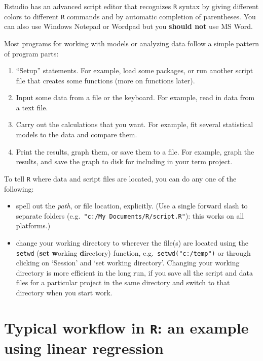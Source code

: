 \documentclass[11pt,]{article}
\begin{document}
Rstudio has an advanced script editor that recognizes \texttt{R} syntax by giving different colors to different \texttt{R} commands and by automatic completion of parentheses. You can also use Windows Notepad or Wordpad but you \textbf{should not} use MS Word.

Most programs for working with models or analyzing data follow a simple pattern of program parts:

\begin{enumerate}
\def\labelenumi{\arabic{enumi}.}
\item
  ``Setup'' statements. For example, load some packages, or run another script file that
  creates some functions (more on functions later).
\item
  Input some data from a file or the keyboard. For example, read in data from a text file.
\item
  Carry out the calculations that you want. For example, fit several statistical models to the data and compare them.
\item
  Print the results, graph them, or save them to a file. For example, graph the results, and save the graph to disk for including in your term project.
\end{enumerate}

To tell \texttt{R} where data and script files are located, you can do any one of the following:

\begin{itemize}
\item
  spell out the \emph{path}, or file location, explicitly. (Use
  a single forward slash to separate folders (e.g.~\texttt{"c:/My\ Documents/R/script.R"}): this works on all platforms.)
\item
  change your working directory to wherever the file(s) are located using the \texttt{setwd} (\textbf{set} \textbf{w}orking \textbf{d}irectory) function, e.g.~\texttt{setwd("c:/temp")} or through clicking on `Session' and `set working directory'. Changing your working directory is more efficient in the long run, if you save all the script and data files for a particular project in the same directory and switch to that directory when you start work.
\end{itemize}

\hypertarget{typical-workflow-in-r-an-example-using-linear-regression}{%
\section{\texorpdfstring{Typical workflow in \texttt{R}: an example using linear regression}{Typical workflow in R: an example using linear regression}}\label{typical-workflow-in-r-an-example-using-linear-regression}}
\end{document}
